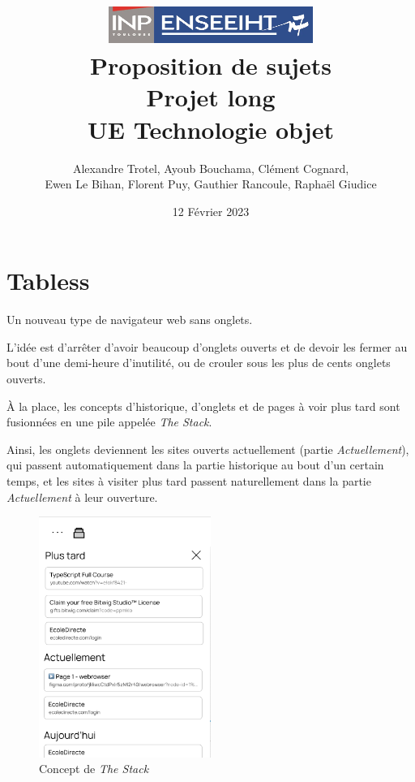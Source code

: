 \documentclass{article}
\begin{document}
    \title{
        \includegraphics[width=0.5\textwidth]{logo-enseeiht.png}
        \\[3cm]
        Proposition de sujets \\
        Projet long \\
        UE Technologie objet
    }

    \author{Alexandre Trotel, Ayoub Bouchama, Clément Cognard, \\
    Ewen Le Bihan, Florent Puy, Gauthier Rancoule, Raphaël Giudice}
    \date{12 Février 2023}

    \maketitle
    \tableofcontents

    \newpage

\section{Tabless}

Un nouveau type de navigateur web sans onglets.

L'idée est d'arrêter d'avoir beaucoup d'onglets ouverts et de devoir les fermer au bout d'une demi-heure d'inutilité, ou de crouler sous les plus de cents onglets ouverts.

À la place, les concepts d'historique, d'onglets et de pages à voir plus tard sont fusionnées en une pile appelée \emph{The Stack}.

Ainsi, les onglets deviennent les sites ouverts actuellement (partie \emph{Actuellement}), qui passent automatiquement dans la partie historique au bout d'un certain temps, et les sites à visiter plus tard passent naturellement dans la partie \emph{Actuellement} à leur ouverture.

\begin{figure}[H]
    \centering
    \includegraphics[width=0.5\textwidth]{tabless.png}
    \caption{Concept de \emph{The Stack}}
    \label{fig:tabless}
\end{figure}
    
\end{document}
